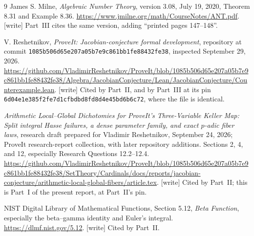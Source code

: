 \documentclass[11pt]{article}
\numberwithin{equation}{section}
\theoremstyle{plain}
\theoremstyle{plain}
\theoremstyle{plain}
\theoremstyle{definition}
\theoremstyle{definition}
\theoremstyle{definition}
\theoremstyle{remark}
\newcommand{\wtag}{\textup{[write]}}%
\newcommand{\dhsha}{\nolinkurl{1085b506d65e207a05b7e9c861bb1fe88432fe38}}
\newcommand{\nssha}{\nolinkurl{6d04e1e385f2fe7d1cfbdbd8fd8d4e45bd6b6c72}}
\begin{document}
\begin{thebibliography}{9}
James S. Milne, \emph{Algebraic Number Theory}, version 3.08,
July 19, 2020, Theorem 8.31 and Example 8.36.
\url{https://www.jmilne.org/math/CourseNotes/ANT.pdf}.
\wtag{} Part~III cites the same version, adding ``printed pages
147--148''.

V. Reshetnikov, \emph{ProveIt: Jacobian-conjecture formal development},
repository at commit \dhsha, inspected September 29, 2026.
\url{https://github.com/VladimirReshetnikov/ProveIt/blob/1085b506d65e207a05b7e9c861bb1fe88432fe38/Algebra/JacobianConjecture/Lean/JacobianConjecture/Counterexample.lean}.
\wtag{} Cited by Part~II, and by Part~III at its pin \nssha, where the
file is identical.

\emph{Arithmetic Local--Global Dichotomies for ProveIt's Three-Variable
Keller Map: Split integral Hasse failures, a dense parameter family,
and exact $p$-adic fiber laws}, research draft prepared for
Vladimir Reshetnikov, September 24, 2026; ProveIt research-report
collection, with later repository additions.
Sections 2, 4, and 12, especially Research Questions 12.2--12.4.
\url{https://github.com/VladimirReshetnikov/ProveIt/blob/1085b506d65e207a05b7e9c861bb1fe88432fe38/SetTheory/Cardinals/docs/reports/jacobian-conjecture/arithmetic-local-global-fibers/article.tex}.
\wtag{} Cited by Part~II; this is Part~I of the present report, at
Part~II's pin.

NIST Digital Library of Mathematical Functions, Section 5.12,
\emph{Beta Function}, especially the beta--gamma identity and Euler's
integral. \url{https://dlmf.nist.gov/5.12}. \wtag{} Cited by Part~II.
\end{thebibliography}
\end{document}
